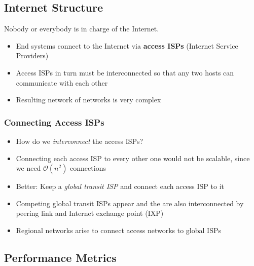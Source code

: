 \subsection{Internet Structure}
Nobody or everybody is in charge of the Internet.
\begin{itemize}
	\item End systems connect to the Internet via \textbf{access ISPs} (Internet Service Providers)
	\item Access ISPs in turn must be interconnected so that any two hosts can communicate with each other
	\item Resulting network of networks is very complex
\end{itemize}

\subsubsection{Connecting Access ISPs}
\begin{itemize}
	\item How do we \textit{interconnect} the access ISPs?
	\item Connecting each access ISP to every other one would not be scalable, since we need $\mathcal{O}(n^2)$ connections
	\item Better: Keep a \textit{global transit ISP} and connect each access ISP to it
	\item Competing global transit ISPs appear and the are also interconnected by peering link and Internet exchange point (IXP)
	\item Regional networks arise to connect access networks to global ISPs
\end{itemize}



\subsection{Performance Metrics}
